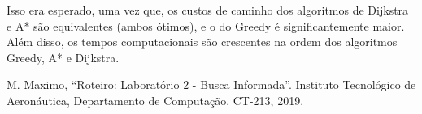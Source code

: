 \documentclass[conference]{IEEEtran}
\begin{document}
Isso era esperado, uma vez que, os custos de caminho dos algoritmos de Dijkstra e A* são equivalentes (ambos ótimos), e o do Greedy é significantemente maior. Além disso, os tempos computacionais são crescentes na ordem dos algoritmos Greedy, A* e Dijkstra.

\begin{thebibliography}{00}
 M. Maximo, ``Roteiro: Laboratório 2 - Busca Informada''. Instituto Tecnológico de Aeronáutica, Departamento de Computação. CT-213, 2019.
\end{thebibliography}
\end{document}

